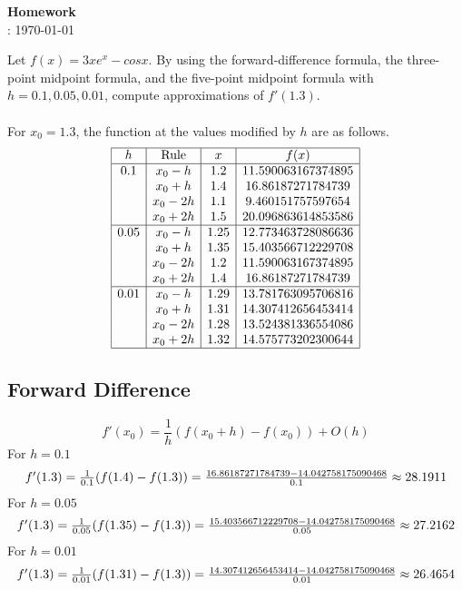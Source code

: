 \documentclass[12pt]{article}
\title{}
\author{Josh Morales}
\date{\today}
\begin{document}
\pagestyle{fancy}
\begin{center}
\textbf{\Large Homework } \\
: \today
\end{center}
\begin{enumerate}[leftmargin=2em]
    Let $f (x) = 3xe^x - cos x$. By using the forward-difference formula, the three-point
midpoint formula, and the five-point midpoint formula with $h = 0.1, 0.05,
0.01$, compute approximations of $f'(1.3)$.\\
\\For $x_0=1.3$, the function at the values modified by $h$ are as follows.
\[
\begin{array}{|c|c|c|c|}
\hline
h & \text{Rule} & x & f(x) \\
\hline
0.1  & x_0 - h  & 1.2  & 11.590063167374895  \\
     & x_0 + h  & 1.4  & 16.86187271784739  \\
     & x_0 - 2h & 1.1  & 9.460151757597654   \\
     & x_0 + 2h & 1.5  & 20.096863614853586  \\
\hline
0.05 & x_0 - h  & 1.25 & 12.773463728086636  \\
     & x_0 + h  & 1.35 & 15.403566712229708  \\
     & x_0 - 2h & 1.2  & 11.590063167374895  \\
     & x_0 + 2h & 1.4  & 16.86187271784739  \\
\hline
0.01 & x_0 - h  & 1.29 & 13.781763095706816  \\
     & x_0 + h  & 1.31 & 14.307412656453414  \\
     & x_0 - 2h & 1.28 & 13.524381336554086  \\
     & x_0 + 2h & 1.32 & 14.575773202300644  \\
\hline
\end{array}
\]

\subsection*{Forward Difference}
\[
f'(x_0) = \frac{1}{h}(f(x_0+h)-f(x_0)) + O(h)
\]
For $h = 0.1$
\[
\hbox{$f'(1.3) = \frac{1}{0.1}(f(1.4)-f(1.3)) = \frac{16.86187271784739-14.042758175090468}{0.1} \approx 28.1911$}
\]
For $h = 0.05$
\[
\hbox{$f'(1.3) = \frac{1}{0.05}(f(1.35)-f(1.3)) = \frac{15.403566712229708-14.042758175090468}{0.05} \approx 27.2162$}
\]
For $h=0.01$
\[
\hbox{$f'(1.3) = \frac{1}{0.01}(f(1.31)-f(1.3)) = \frac{14.307412656453414-14.042758175090468}{0.01} \approx 26.4654$}
\]

\end{enumerate}
\end{document}
